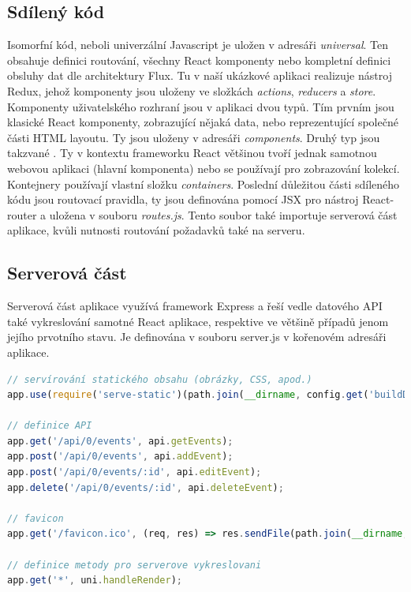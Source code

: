 \subsection{Sdílený kód}
Isomorfní kód, neboli univerzální Javascript je uložen v adresáři \textit{universal}. Ten obsahuje definici routování, všechny React komponenty nebo kompletní definici obsluhy dat dle architektury Flux. Tu v naší ukázkové aplikaci realizuje nástroj Redux, jehož komponenty jsou uloženy ve složkách \textit{actions}, \textit{reducers} a \textit{store}. Komponenty uživatelského rozhraní jsou v aplikaci dvou typů. Tím prvním jsou klasické React komponenty, zobrazující nějaká data, nebo reprezentující společné části HTML layoutu. Ty jsou uloženy v adresáři \textit{components}. Druhý typ jsou takzvané . Ty v kontextu frameworku React většinou tvoří jednak samotnou webovou aplikaci (hlavní komponenta) nebo se používají pro zobrazování kolekcí. Kontejnery používají vlastní složku \textit{containers}. Poslední důležitou části sdíleného kódu jsou routovací pravidla, ty jsou definována pomocí JSX pro nástroj React-router a uložena v souboru \textit{routes.js}. Tento soubor také importuje serverová část aplikace, kvůli nutnosti routování požadavků také na serveru.

\subsection{Serverová část}
Serverová část aplikace využívá framework Express a řeší vedle datového API také vykreslování samotné React aplikace, respektive ve většině případů jenom jejího prvotního stavu. Je definována v souboru server.js v kořenovém adresáři aplikace.
\begin{lstlisting}[language=Javascript, caption={Ukázka serverové části isomorfní webové aplikace}]
// servírování statického obsahu (obrázky, CSS, apod.)
app.use(require('serve-static')(path.join(__dirname, config.get('buildDirectory'))));

// definice API
app.get('/api/0/events', api.getEvents);
app.post('/api/0/events', api.addEvent);
app.post('/api/0/events/:id', api.editEvent);
app.delete('/api/0/events/:id', api.deleteEvent);

// favicon
app.get('/favicon.ico', (req, res) => res.sendFile(path.join(__dirname, 'images', 'favicon.ico')));

// definice metody pro serverove vykreslovani
app.get('*', uni.handleRender);
\end{lstlisting}

